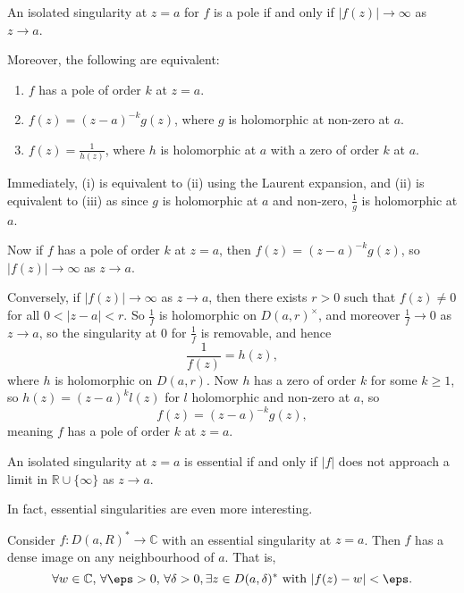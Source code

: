 \documentclass[12pt]{article}
\begin{document}
\begin{proposition}
	An isolated singularity at $z = a$ for $f$ is a pole if and only if $|f(z)| \to \infty$ as $z \to a$.

	Moreover, the following are equivalent:
	\begin{enumerate}[\normalfont(i)]
		\item $f$ has a pole of order $k$ at $z = a$.
		\item $f(z) = (z-a)^{-k}g(z)$, where $g$ is holomorphic at non-zero at $a$.
		\item $f(z) = \frac{1}{h(z)}$, where $h$ is holomorphic at $a$ with a zero of order $k$ at $a$.
	\end{enumerate}
\end{proposition}

\begin{proofbox}
	Immediately, (i) is equivalent to (ii) using the Laurent expansion, and (ii) is equivalent to (iii) as since $g$ is holomorphic at $a$ and non-zero, $\frac{1}{g}$ is holomorphic at $a$.

	Now if $f$ has a pole of order $k$ at $z = a$, then $f(z) = (z - a)^{-k}g(z)$, so $|f(z)| \to \infty$ as $z \to a$.

	Conversely, if $|f(z)| \to \infty$ as $z \to a$, then there exists $r > 0$ such that $f(z) \neq 0$ for all $0 < |z-a| < r$. So $\frac{1}{f}$ is holomorphic on $D(a, r)^{\times}$, and moreover $\frac{1}{f} \to 0$ as $z \to a$, so the singularity at $0$ for $\frac{1}{f}$ is removable, and hence
	\[
	\frac{1}{f(z)} = h(z),
	\]
	where $h$ is holomorphic on $D(a, r)$. Now $h$ has a zero of order $k$ for some $k \geq 1$, so $h(z) = (z - a)^{k}l(z)$ for $l$ holomorphic and non-zero at $a$, so
	\[
	f(z) = (z - a)^{-k}g(z),
	\]
	meaning $f$ has a pole of order $k$ at $z = a$.
\end{proofbox}

\begin{corollary}
	An isolated singularity at $z = a$ is essential if and only if $|f|$ does not approach a limit in $\mathbb{R} \cup \{\infty\}$ as $z \to a$.
\end{corollary}

In fact, essential singularities are even more interesting.

\begin{theorem}
	Consider $f : D(a, R)^{*} \to \mathbb{C}$ with an essential singularity at $z = a$. Then $f$ has a dense image on any neighbourhood of $a$. That is,
	\[
		\forall w \in \mathbb{C},\, \forall \eps > 0, \, \forall \delta > 0, \exists z \in D(a, \delta)^{*} \text{ with } |f(z)-w| < \eps.
	\]
\end{theorem}
\end{document}
